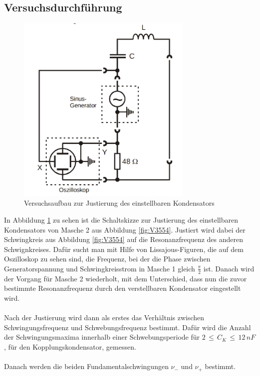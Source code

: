\documentclass[
  bibliography=totoc,     %
  captions=tableheading,  %
  titlepage=firstiscover, %
]{scrartcl}
\begin{document}
\subsection{Versuchsdurchführung}
\label{sec:versuchsdurchführung}
\begin{figure}[htb]
  \centering
  \includegraphics[width=0.75\textwidth]{V3553.png}
  \caption{Versuchsaufbau zur Justierung des einstellbaren Kondensators}
  \label{fig:V3553}
\end{figure}
In Abbildung \ref{fig:V3553} zu sehen ist die Schaltskizze zur Justierung
des einstellbaren Kondensators von Masche 2 aus Abbildung \ref{fig:V3554}.
Justiert wird dabei der Schwingkreis aus Abbildung \ref{fig:V3554} auf die
Resonanzfrequenz des anderen Schwignkreises. Dafür sucht man mit Hilfe von
Lissajous-Figuren, die auf dem Oszilloskop zu sehen sind, die Frequenz, bei der
die Phase zwischen Generatorspannung und Schwingkreisstrom in Masche 1
gleich $\frac{\pi}{2}$ ist. Danach wird der Vorgang für Masche 2 wiederholt, mit
dem Unterschied, dass nun die zuvor bestimmte Resonanzfrequenz durch den
verstellbaren Kondensator eingestellt wird. \\
\\
Nach der Justierung wird dann als erstes das Verhältnis zwischen Schwingungsfrequenz
und Schwebungsfrequenz bestimmt. Dafür wird die Anzahl der Schwingungsmaxima
innerhalb einer Schwebungsperiode für $2\,\leq\,C_K\,\leq\,12\,nF$, für den
Kopplungskondensator, gemessen. \\
\\
Danach werden die beiden Fundamentalschwingungen $\nu_-$ und $\nu_+$ bestimmt.
\end{document}
